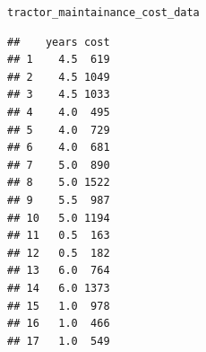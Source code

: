 \documentclass[10pt, a4paper]{article}\usepackage[]{graphicx}\usepackage[]{xcolor}
\makeatletter
\newcommand{\hlstd}[1]{\textcolor[rgb]{0.345,0.345,0.345}{#1}}%
\newenvironment{kframe}{%
 \def\at@end@of@kframe{}%
 \ifinner\ifhmode%
  \def\at@end@of@kframe{\end{minipage}}%
  \begin{minipage}{\columnwidth}%
 \fi\fi%
 \def\FrameCommand##1{\hskip\@totalleftmargin \hskip-\fboxsep
 \colorbox{shadecolor}{##1}\hskip-\fboxsep
     \hskip-\linewidth \hskip-\@totalleftmargin \hskip\columnwidth}%
 \MakeFramed {\advance\hsize-\width
   \@totalleftmargin\z@ \linewidth\hsize
   \@setminipage}}%
 {\par\unskip\endMakeFramed%
 \at@end@of@kframe}
\newenvironment{knitrout}{}{} %
\makeatother
\begin{document}
\begin{knitrout}
\color{fgcolor}\begin{kframe}
\begin{alltt}
\hlstd{tractor_maintainance_cost_data}
\end{alltt}
\begin{verbatim}
##    years cost
## 1    4.5  619
## 2    4.5 1049
## 3    4.5 1033
## 4    4.0  495
## 5    4.0  729
## 6    4.0  681
## 7    5.0  890
## 8    5.0 1522
## 9    5.5  987
## 10   5.0 1194
## 11   0.5  163
## 12   0.5  182
## 13   6.0  764
## 14   6.0 1373
## 15   1.0  978
## 16   1.0  466
## 17   1.0  549
\end{verbatim}
\end{kframe}
\end{knitrout}

\newpage
\end{document}
